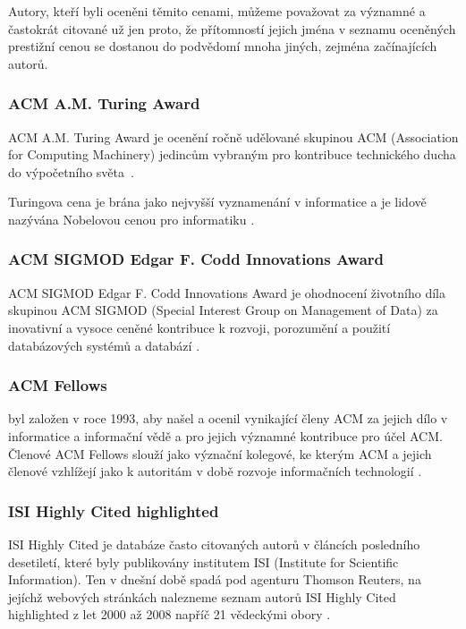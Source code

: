 \documentclass{bakalarka}
\begin{document}
Autory, kteří byli oceněni těmito cenami, můžeme považovat za významné a
častokrát citované už jen proto, že přítomností jejich jména v seznamu
oceněných prestižní cenou se dostanou do podvědomí mnoha jiných, zejména
začínajících autorů.

\subsubsection{ACM A.M. Turing Award}
ACM A.M. Turing Award je ocenění ročně udělované skupinou ACM (Association for
Computing Machinery) jedincům vybraným pro kontribuce technického ducha do
výpočetního světa~\cite{turingaward}.

Turingova cena je brána jako nejvyšší vyznamenání v informatice a je lidově
nazývána Nobelovou cenou pro informatiku \cite[p.~317]{dasgupta}.

\subsubsection{ACM SIGMOD Edgar F. Codd Innovations Award}
ACM SIGMOD Edgar F. Codd Innovations Award je ohodnocení životního díla
skupinou ACM SIGMOD (Special Interest Group on Management of Data) za
inovativní a vysoce ceněné kontribuce k rozvoji, porozumění a použití
databázových systémů a databází \cite{sigmodinnovations}.

\subsubsection{ACM Fellows}
 byl založen v roce 1993, aby našel a ocenil
vynikající členy ACM za jejich dílo v informatice a informační vědě a pro
jejich významné kontribuce pro účel ACM. Členové ACM Fellows slouží jako
význační kolegové, ke kterým ACM a jejich členové vzhlížejí jako k autoritám v
době rozvoje informačních technologií \cite{acmfellows}.

\subsubsection{ISI Highly Cited highlighted}
ISI Highly Cited je databáze často citovaných autorů v článcích posledního
desetiletí, které byly publikovány institutem ISI (Institute for Scientific
Information). Ten v dnešní době spadá pod agenturu Thomson Reuters, na jejíchž
webových stránkách nalezneme seznam autorů ISI Highly Cited highlighted z let
2000 až 2008 napříč 21 vědeckými obory \cite{highlycited}.
\end{document}

